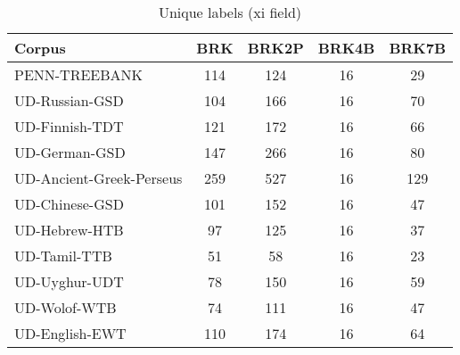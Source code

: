 \begin{table}[h]
    \centering
    \caption{Unique labels (xi field)}
    \label{tab:unique}
    \begin{tabular}{lcccc}
        \hline
        Corpus                      & BRK & BRK2P & BRK4B & BRK7B \\
        \hline
        PENN-TREEBANK               & 114 &   124 &    16 &    29 \\
        UD-Russian-GSD              & 104 &   166 &    16 &    70 \\
        UD-Finnish-TDT              & 121 &   172 &    16 &    66 \\
        UD-German-GSD               & 147 &   266 &    16 &    80 \\
        UD-Ancient-Greek-Perseus    & 259 &   527 &    16 &   129 \\
        UD-Chinese-GSD              & 101 &   152 &    16 &    47 \\
        UD-Hebrew-HTB               &  97 &   125 &    16 &    37 \\
        UD-Tamil-TTB                &  51 &    58 &    16 &    23 \\
        UD-Uyghur-UDT               &  78 &   150 &    16 &    59 \\
        UD-Wolof-WTB                &  74 &   111 &    16 &    47 \\
        UD-English-EWT              & 110 &   174 &    16 &    64 \\
        \hline
    \end{tabular}
\end{table}

